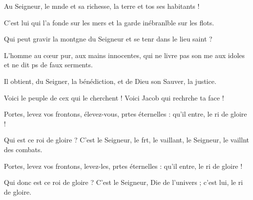 \item Au Seigneur, le mnde et sa richesse,\psstar{} la terre et tos ses habitants !
\item C’est lui qui l’a fonde sur les mers\psstar{} et la garde inébranlble sur les flots.
\item Qui peut gravir la montgne du Seigneur\psstar{} et se tenr dans le lieu saint ?
\item L’homme au cœur pur, aux mains innocentes,\pscross{} qui ne livre pas son me aux idoles\psstar{} et ne dit ps de faux serments.
\item Il obtient, du Seigner, la bénédiction,\psstar{} et de Dieu son Sauver, la justice.
\item Voici le peuple de cex qui le cherchent !\psstar{} Voici Jacob qui rechrche ta face !
\item Portes, levez vos frontons,\pscross{} élevez-vous, prtes éternelles :\psstar{} qu’il entre, le ri de gloire !
\item Qui est ce roi de gloire ?\pscross{} C’est le Seigneur, le frt, le vaillant,\psstar{} le Seigneur, le vaillnt des combats.
\item Portes, levez vos frontons,\pscross{} levez-les, prtes éternelles :\psstar{} qu’il entre, le ri de gloire !
\item Qui donc est ce roi de gloire ?\pscross{} C’est le Seigneur, Die de l’univers ;\psstar{} c’est lui, le ri de gloire.